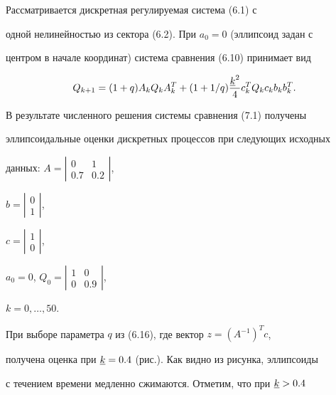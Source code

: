 




\begin{exam}


Рассматривается дискретная регулируемая система (6.1) с


одной нелинейностью из сектора (6.2). При $a_0=0$ (эллипсоид задан с


центром в начале координат) система сравнения (6.10) принимает вид


\begin{equation}


Q_{k+1}=(1+q)A_k Q_k A^T_k+(1+1/q)\frac{\uk^2}{4}


c^T_k Q_k c_k b_k b^T_k.


\end{equation}





В результате численного решения системы сравнения (7.1) получены


эллипсоидальные оценки дискретных процессов при следующих исходных


данных: $A=


\left|\begin{smallmatrix}0 & 1\\ 0.7 & 0.2\end{smallmatrix}\right|$,


$b=\left|\begin{smallmatrix}0 \\ 1\end{smallmatrix}\right|$,


$c=\left|\begin{smallmatrix}1\\0\end{smallmatrix}\right|$,


$a_0=0$, $Q_0=\left|


\begin{smallmatrix}1 & 0 \\0 & 0.9\end{smallmatrix}\right|$,


$k=0,\dotsc,50$.





При выборе параметра $q$ из (6.16), где вектор $z=(A^{-1})^T c$,


получена оценка при $\underline k=0.4$ (рис.). Как видно из рисунка, эллипсоиды


с течением времени медленно сжимаются. Отметим, что при $\underline k>0.4$



\end{exam}
